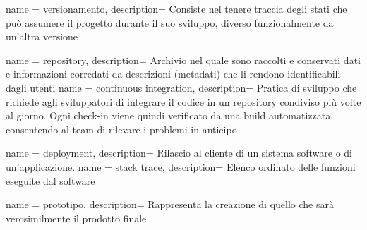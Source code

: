  {
  name = versionamento,
  description={
		Consiste nel tenere traccia degli stati che può assumere il progetto durante il suo sviluppo, diverso funzionalmente da un'altra versione}
}

 {
  name = repository,
  description={
		Archivio nel quale sono raccolti e conservati dati e informazioni corredati da descrizioni (metadati) che li rendono identificabili dagli utenti}
}
 {
  name = continuous integration,
  description={
		Pratica di sviluppo che richiede agli sviluppatori di integrare il codice in un repository condiviso più volte al giorno. Ogni check-in viene quindi verificato da una build automatizzata, consentendo al team di rilevare i problemi in anticipo}
}

 {
  name = deployment,
  description={
		Rilascio al cliente di un sistema software o di un’applicazione.}
}
 {
  name = stack trace,
  description={
		Elenco ordinato delle funzioni eseguite dal software}
}

 {
  name = prototipo,
  description={
		Rappresenta la creazione di quello che sarà verosimilmente il prodotto finale}
}


